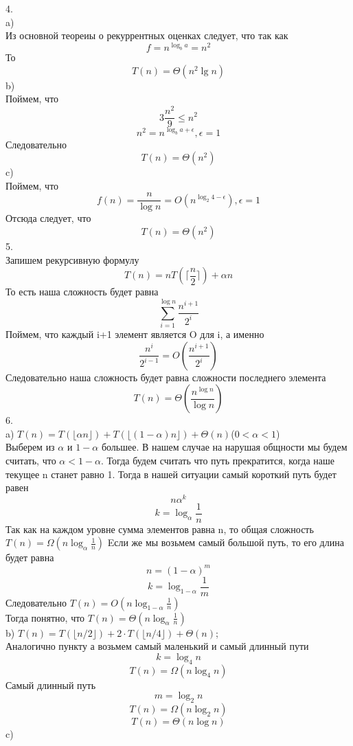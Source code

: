 \documentclass[a4paper,12pt]{article}
\begin{document}
4.\\
a)\\
Из основной теореиы о рекуррентных оценках следует, что так как \[f=n^{\log_b a}=n^2\]
То \[T(n)=\Theta(n^2 \lg n)\]
b)\\
Поймем, что \[3 \frac{n^2}{9}\leq n^2\]
\[n^2=n^{\log_b a+\epsilon},\epsilon=1\] 
Следовательно \[T(n)=\Theta(n^2)\]
c)\\
Поймем, что 
\[f(n)=\frac{n}{\log n}=O(n^{\log_2 4 -\epsilon}),\epsilon=1\]
Отсюда следует, что 
\[T(n)=\Theta(n^2)\]
5.\\
Запишем рекурсивную формулу
\[T(n)=n T(\lceil \frac{n}{2}\rceil)+\alpha n \]
То есть наша сложность будет равна
\[\sum_{i=1}^{\log n}\frac{n^{i+1}}{2^i}\]
Поймем, что каждый i+1 элемент является O для i, а именно
\[\frac{n^{i}}{2^{i-1}}=O(\frac{n^{i+1}}{2^i})\]
Следовательно наша сложность будет равна сложности последнего элемента
\[T(n)=\Theta(\frac{n^{\log n}}{\log n})\]
6.\\
a) $T(n)=T(\lfloor \alpha n\rfloor)+T( \lfloor(1-\alpha)n\rfloor)+\Theta(n)$\quad  ($0 < \alpha < 1$)\\
Выберем из $\alpha$ и $1-\alpha$ большее. В нашем случае на нарушая общности мы будем считать, что $\alpha<1-\alpha$. Тогда будем считать что путь прекратится, когда наше текущее n станет равно 1. Тогда в нашей ситуации самый короткий путь будет равен\[n \alpha^{k}\]
\[k=\log_{\alpha} {\frac{1}{n}}\]
Так как на каждом уровне сумма элементов равна n,  то общая сложность $T(n)=\Omega(n \log_{\alpha}{\frac{1}{n}})$
Eсли же мы возьмем самый большой путь, то его длина будет равна \[n= ({1-\alpha})^{m}\]
\[k=\log_{1-\alpha} {\frac{1}{m}}\]
Следовательно $T(n)=O(n \log_{1-\alpha}{\frac{1}{n}})$\\
Тогда понятно, что $T(n)=\Theta(n \log_{\alpha}{\frac{1}{n}})$\\
 b)
 $T(n)=T(\lfloor n/2\rfloor)+2\cdot T(\lfloor n/4\rfloor)+\Theta(n)$;
\\
Аналогично пункту а возьмем самый маленький и самый длинный пути
\[k=\log_{4} {n}\]
\[T(n)=\Omega(n \log_{4} n)\]
Самый длинный путь
\[m=\log_{2} {n}\]
\[T(n)=\Omega(n \log_{2} n)\]
\[T(n)=\Theta(n \log n)\]
c)
\end{document}
